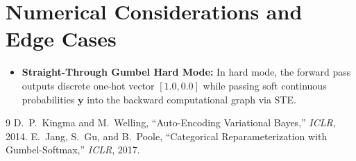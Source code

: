 \documentclass[11pt]{article}
\begin{document}
\section{Numerical Considerations and Edge Cases}
\label{sec:numerical}

\begin{itemize}
    \item \textbf{Straight-Through Gumbel Hard Mode:} In hard mode, the forward pass outputs discrete one-hot vector $[1.0, 0.0]$ while passing soft continuous probabilities $\mathbf{y}$ into the backward computational graph via STE.
\end{itemize}

\begin{thebibliography}{9}
 D.~P.~Kingma and M.~Welling, ``Auto-Encoding Variational Bayes,'' \emph{ICLR}, 2014.
 E.~Jang, S.~Gu, and B.~Poole, ``Categorical Reparameterization with Gumbel-Softmax,'' \emph{ICLR}, 2017.
\end{thebibliography}
\end{document}
